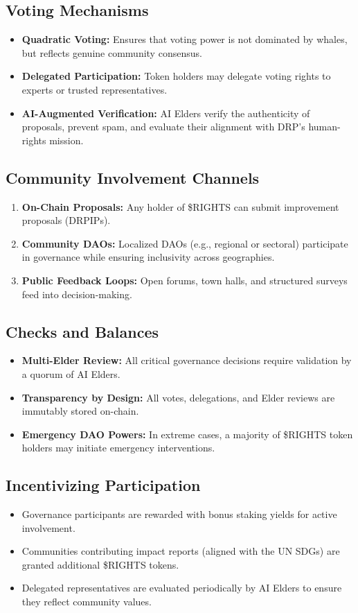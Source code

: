 \documentclass[11pt,a4paper]{article}
\begin{document}
\subsection{Voting Mechanisms}
\begin{itemize}
    \item \textbf{Quadratic Voting:} Ensures that voting power is not dominated by whales, but reflects genuine community consensus.
    \item \textbf{Delegated Participation:} Token holders may delegate voting rights to experts or trusted representatives.
    \item \textbf{AI-Augmented Verification:} AI Elders verify the authenticity of proposals, prevent spam, and evaluate their alignment with DRP’s human-rights mission.
\end{itemize}

\subsection{Community Involvement Channels}
\begin{enumerate}
    \item \textbf{On-Chain Proposals:} Any holder of \$RIGHTS can submit improvement proposals (DRPIPs).
    \item \textbf{Community DAOs:} Localized DAOs (e.g., regional or sectoral) participate in governance while ensuring inclusivity across geographies.
    \item \textbf{Public Feedback Loops:} Open forums, town halls, and structured surveys feed into decision-making.
\end{enumerate}

\subsection{Checks and Balances}
\begin{itemize}
    \item \textbf{Multi-Elder Review:} All critical governance decisions require validation by a quorum of AI Elders.
    \item \textbf{Transparency by Design:} All votes, delegations, and Elder reviews are immutably stored on-chain.
    \item \textbf{Emergency DAO Powers:} In extreme cases, a majority of \$RIGHTS token holders may initiate emergency interventions.
\end{itemize}

\subsection{Incentivizing Participation}
\begin{itemize}
    \item Governance participants are rewarded with bonus staking yields for active involvement.
    \item Communities contributing impact reports (aligned with the UN SDGs) are granted additional \$RIGHTS tokens.
    \item Delegated representatives are evaluated periodically by AI Elders to ensure they reflect community values.
\end{itemize}
\end{document}
